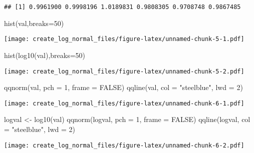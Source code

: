 \documentclass[
]{article}
\newenvironment{Shaded}{\begin{snugshade}}{\end{snugshade}}
\newcommand{\AttributeTok}[1]{\textcolor[rgb]{0.77,0.63,0.00}{#1}}
\newcommand{\ConstantTok}[1]{\textcolor[rgb]{0.00,0.00,0.00}{#1}}
\newcommand{\DecValTok}[1]{\textcolor[rgb]{0.00,0.00,0.81}{#1}}
\newcommand{\FunctionTok}[1]{\textcolor[rgb]{0.00,0.00,0.00}{#1}}
\newcommand{\NormalTok}[1]{#1}
\newcommand{\OtherTok}[1]{\textcolor[rgb]{0.56,0.35,0.01}{#1}}
\newcommand{\StringTok}[1]{\textcolor[rgb]{0.31,0.60,0.02}{#1}}
\begin{document}
\begin{verbatim}
## [1] 0.9961900 0.9998196 1.0189831 0.9808305 0.9708748 0.9867485
\end{verbatim}

\begin{Shaded}
\begin{Highlighting}[]
\FunctionTok{hist}\NormalTok{(val,}\AttributeTok{breaks=}\DecValTok{50}\NormalTok{)}
\end{Highlighting}
\end{Shaded}

\texttt{[image: create\_log\_normal\_files/figure-latex/unnamed-chunk-5-1.pdf]}

\begin{Shaded}
\begin{Highlighting}[]
\FunctionTok{hist}\NormalTok{(}\FunctionTok{log10}\NormalTok{(val),}\AttributeTok{breaks=}\DecValTok{50}\NormalTok{)}
\end{Highlighting}
\end{Shaded}

\texttt{[image: create\_log\_normal\_files/figure-latex/unnamed-chunk-5-2.pdf]}

\begin{Shaded}
\begin{Highlighting}[]
\FunctionTok{qqnorm}\NormalTok{(val, }\AttributeTok{pch =} \DecValTok{1}\NormalTok{, }\AttributeTok{frame =} \ConstantTok{FALSE}\NormalTok{)}
\FunctionTok{qqline}\NormalTok{(val, }\AttributeTok{col =} \StringTok{"steelblue"}\NormalTok{, }\AttributeTok{lwd =} \DecValTok{2}\NormalTok{)}
\end{Highlighting}
\end{Shaded}

\texttt{[image: create\_log\_normal\_files/figure-latex/unnamed-chunk-6-1.pdf]}

\begin{Shaded}
\begin{Highlighting}[]
\NormalTok{logval }\OtherTok{\textless{}{-}} \FunctionTok{log10}\NormalTok{(val)}
\FunctionTok{qqnorm}\NormalTok{(logval, }\AttributeTok{pch =} \DecValTok{1}\NormalTok{, }\AttributeTok{frame =} \ConstantTok{FALSE}\NormalTok{)}
\FunctionTok{qqline}\NormalTok{(logval, }\AttributeTok{col =} \StringTok{"steelblue"}\NormalTok{, }\AttributeTok{lwd =} \DecValTok{2}\NormalTok{)}
\end{Highlighting}
\end{Shaded}

\texttt{[image: create\_log\_normal\_files/figure-latex/unnamed-chunk-6-2.pdf]}
\end{document}
